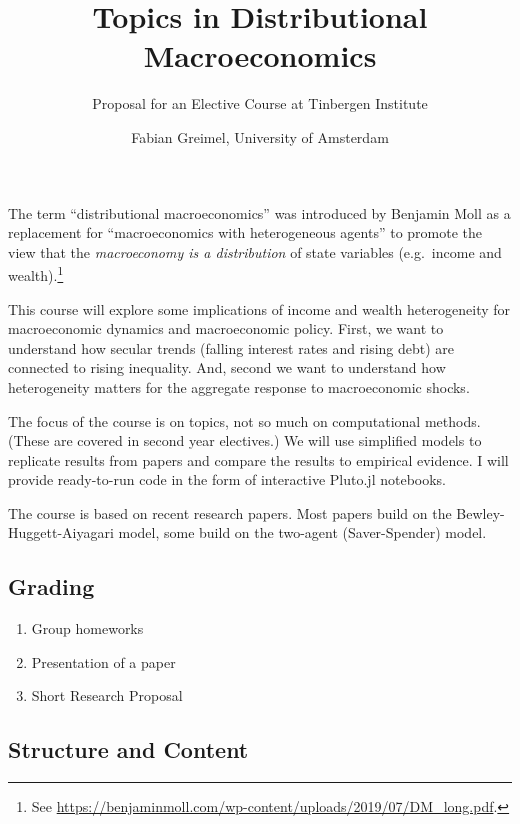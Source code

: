 \documentclass[a4paper,11pt]{article}
\title{Topics in Distributional Macroeconomics}
\date{\vspace{-2ex} Fabian Greimel, University of Amsterdam}
\author{Proposal for an Elective Course at Tinbergen Institute}
\begin{document}
\maketitle

\noindent
The term ``distributional macroeconomics'' was introduced by Benjamin Moll as a replacement for ``macroeconomics with heterogeneous agents'' to promote the view that the \emph{macroeconomy is a distribution} of state variables (e.g.\ income and wealth).\footnote{See \url{ https://benjaminmoll.com/wp-content/uploads/2019/07/DM_long.pdf}.}

This course will explore some implications of income and wealth heterogeneity for macroeconomic dynamics and macroeconomic policy. First, we want to understand how secular trends (falling interest rates and rising debt) are connected to rising inequality. And, second we want to understand how heterogeneity matters for the aggregate response to macroeconomic shocks.

The focus of the course is on topics, not so much on computational methods. (These are covered in second year electives.) We will use simplified models to replicate results from papers and compare the results to empirical evidence. I will provide ready-to-run code in the form of interactive Pluto.jl notebooks. 

The course is based on recent research papers. Most papers build on the Bewley-Huggett-Aiyagari model, some build on the two-agent (Saver-Spender) model. 

\subsection*{Grading}

\begin{enumerate}
\item Group homeworks
\item Presentation of a paper
\item Short Research Proposal
\end{enumerate}

\subsection*{Structure and Content}
\end{document}
